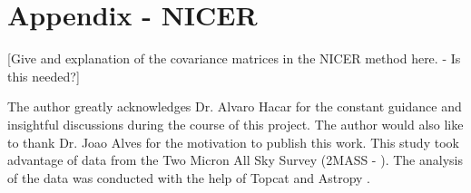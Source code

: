 \documentclass{aa}
\begin{document}
\section{Appendix - NICER}   
[Give and explanation of the covariance matrices in the NICER method here. - Is this needed?]




\begin{acknowledgements}
The author greatly acknowledges Dr. Alvaro Hacar for the constant guidance and insightful discussions during the course of this project. The author would also like to thank Dr. Joao Alves for the motivation to publish this work. This study took advantage of data from the Two Micron All Sky Survey (2MASS - \citealt{2mass}). The analysis of the data was conducted with the help of Topcat \citep{topcat} and Astropy \citep{astropy}.
\end{acknowledgements}


\end{document}
